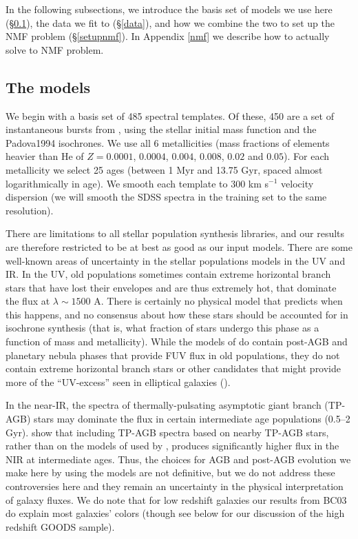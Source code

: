 \documentclass[10pt,preprint]{aastex}
\renewcommand{\AA}{A}
\newcounter{address}
\begin{document}
In the following subsections, we introduce the basis set of models we
use here (\S\ref{models}), the data we fit to (\S\ref{data}), and how
we combine the two to set up the NMF problem (\S\ref{setupnmf}).  In
Appendix \ref{nmf} we describe how to actually solve to NMF problem.

\subsection{The models}
\label{models}

We begin with a basis set of 485 spectral templates. Of these, 450 are
a set of instantaneous bursts from \citet{bruzual03a}, using the
\citet{chabrier03a} stellar initial mass function and the Padova1994
isochrones. We use all 6 metallicities (mass fractions of elements
heavier than He of $Z= 0.0001$, $0.0004$, $0.004$, $0.008$, $0.02$ and
$0.05$).  For each metallicity we select 25 ages (between 1 Myr and
13.75 Gyr, spaced almost logarithmically in age).  We smooth each
template to $300$ km s$^{-1}$ velocity dispersion (we will smooth the
SDSS spectra in the training set to the same resolution).

There are limitations to all stellar population synthesis libraries,
and our results are therefore restricted to be at best as good as our
input models. There are some well-known areas of uncertainty in the
stellar populations models in the UV and IR. In the UV, old
populations sometimes contain extreme horizontal branch stars that
have lost their envelopes and are thus extremely hot, that dominate
the flux at $\lambda \sim 1500$ \AA. There is certainly no physical
model that predicts when this happens, and no consensus about how
these stars should be accounted for in isochrone synthesis (that is,
what fraction of stars undergo this phase as a function of mass and
metallicity). While the models of \cite{bruzual03a} do contain
post-AGB and planetary nebula phases that provide FUV flux in old
populations, they do not contain extreme horizontal branch stars or
other candidates that might provide more of the ``UV-excess'' seen in
elliptical galaxies (\citealt{greggio90a, brown00a}).  

In the near-IR, the spectra of thermally-pulsating asymptotic giant
branch (TP-AGB) stars may dominate the flux in certain intermediate
age populations (0.5--2 Gyr).  \citet{maraston05a} show that including
TP-AGB spectra based on nearby TP-AGB stars, rather than on the models
of \citet{vassiliadis93a} used by \citet{bruzual03a}, produces
significantly higher flux in the NIR at intermediate ages. Thus, the
choices for AGB and post-AGB evolution we make here by using the
models \cite{bruzual03a} are not definitive, but we do not address
these controversies here and they remain an uncertainty in the
physical interpretation of galaxy fluxes.  We do note that for low
redshift galaxies our results from BC03 do explain most galaxies'
colors (though see below for our discussion of the high redshift GOODS
sample).
\end{document}
